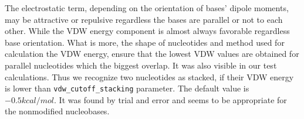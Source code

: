\documentclass[12pt]{article}
\begin{document}
The electrostatic term, depending on the orientation of bases' dipole moments, may be attractive or repulsive regardless the bases are parallel or not to each other. While the VDW energy component is almost always favorable regardless base orientation.
What is more, the shape of nucleotides and method used for calculation the VDW energy, ensure that the lowest VDW values are obtained for parallel nucleotides which the biggest overlap.
It was also visible in our test calculations.
Thus we recognize two nucleotides as stacked, if their VDW energy is lower than \texttt{vdw\_cutoff\_stacking} parameter. 
The default value is $ -0.5 kcal/mol$.
It was found by trial and error and seems to be appropriate for the nonmodified nucleobases.


\end{document}
